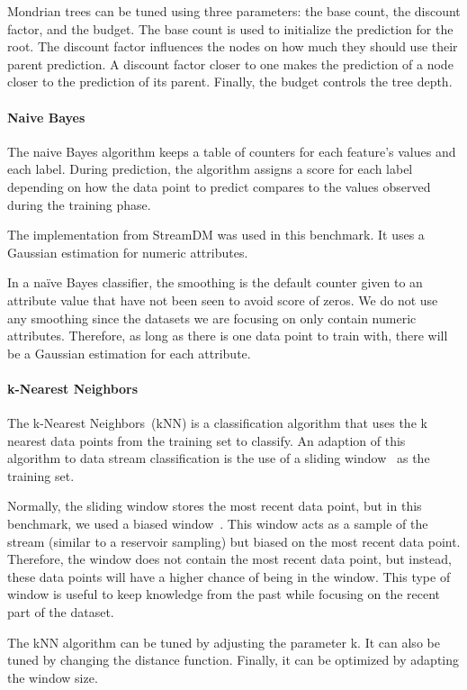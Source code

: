 Mondrian trees can be tuned using three
parameters: the base count, the discount factor,
and the budget. The base count is used to
initialize the prediction for the root. The
discount factor influences the nodes on how much
they should use their parent prediction. A
discount factor closer to one makes the prediction
of a node closer to the prediction of its parent.
Finally, the budget controls the tree depth.

\paragraph{Naive Bayes~\cite{naive_bayes}}
The naive Bayes algorithm keeps a table of
counters for each feature's values and each label.
During prediction, the algorithm assigns a
score for each label depending on how the data
point to predict compares to the values observed
during the training phase.

The implementation from StreamDM was used in this
benchmark. It uses a Gaussian
estimation for numeric attributes.

In a naïve Bayes classifier, the smoothing is the
default counter given to an attribute value that
have not been seen to avoid score of zeros.
We do not use any smoothing since the datasets
we are focusing on only contain numeric
attributes. Therefore, as long as there is one data
point to train with, there will be a Gaussian
estimation for each attribute.

\paragraph{k-Nearest Neighbors}
The k-Nearest Neighbors~(kNN) is a classification
algorithm that uses the k nearest data points from
the training set to classify.  An adaption of this
algorithm to data stream classification is the use
of a sliding window~\cite{Mining_Massive_Datasets}
as the training set.

Normally, the sliding window stores the most
recent data point, but in this benchmark, we used
a biased window~\cite{biased_reservoir_sampling}.
This window acts as a sample of
the stream (similar to a reservoir sampling) but
biased on the most recent data point.  Therefore,
the window does not contain the most recent data
point, but instead, these data points will have a
higher chance of being in the window.  This type
of window is useful to keep knowledge from the
past while focusing on the recent part of the
dataset.

The kNN algorithm can be tuned by adjusting the
parameter k. It can also be tuned by changing the
distance function. Finally, it can be optimized by
adapting the window size.

